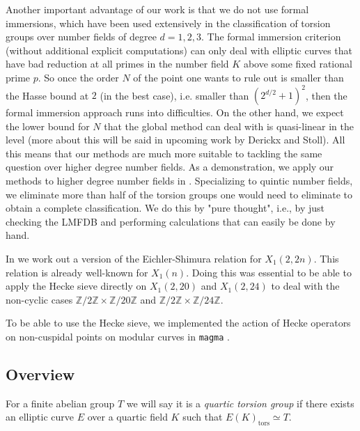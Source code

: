 \documentclass[11pt,reqno]{amsart}
\theoremstyle{definition}
\numberwithin{equation}{section}
\newcommand{\tor}{\mathrm{tors}}
\def\tg#1#2{\mathbb Z/#1\mathbb Z \times \mathbb Z /#2 \mathbb Z}
\begin{document}
Another important advantage of our work is that we do not use formal immersions, which have been used extensively in the classification of torsion groups over number fields of degree $d=1,2,3.$  The formal immersion criterion (without additional explicit computations) can only deal with elliptic curves that have bad reduction at all primes in the number field $K$ above some fixed rational prime $p$. So once the order $N$ of the point one wants to rule out is smaller than the Hasse bound at $2$ (in the best case), i.e. smaller than $(2^{d/2}+1)^2$, then the formal immersion approach runs into difficulties. On the other hand, we expect the lower bound for $N$ that the global method can deal with is quasi-linear in the level (more about this will be said in upcoming work by Derickx and Stoll). All this means that our methods are much more suitable to tackling the same question over higher degree number fields. As a demonstration, we apply our methods to higher degree number fields in . Specializing to quintic number fields, we eliminate more than half of the torsion groups one would need to eliminate to obtain a complete classification. We do this by "pure thought", i.e., by just checking the LMFDB and performing calculations that can easily be done by hand. 

In  we work out a version of the Eichler-Shimura relation for $X_1(2,2n)$. This relation is already well-known for $X_1(n)$. Doing this was essential to be able to apply the Hecke sieve directly on $X_1(2,20)$ and $X_1(2,24)$ to deal with the non-cyclic cases $\tg{2}{20}$ and $\tg{2}{24}$.


To be able to use the Hecke sieve, we implemented the action of Hecke operators on non-cuspidal points on modular curves in \texttt{magma} \cite{magma}. 




\subsection{Overview} \label{sec:overview}
For a finite abelian group $T$ we will say it is a \textit{quartic torsion group} if there exists an elliptic curve $E$ over a quartic field $K$ such that $E(K)_\tor\simeq T$. 
\end{document}
